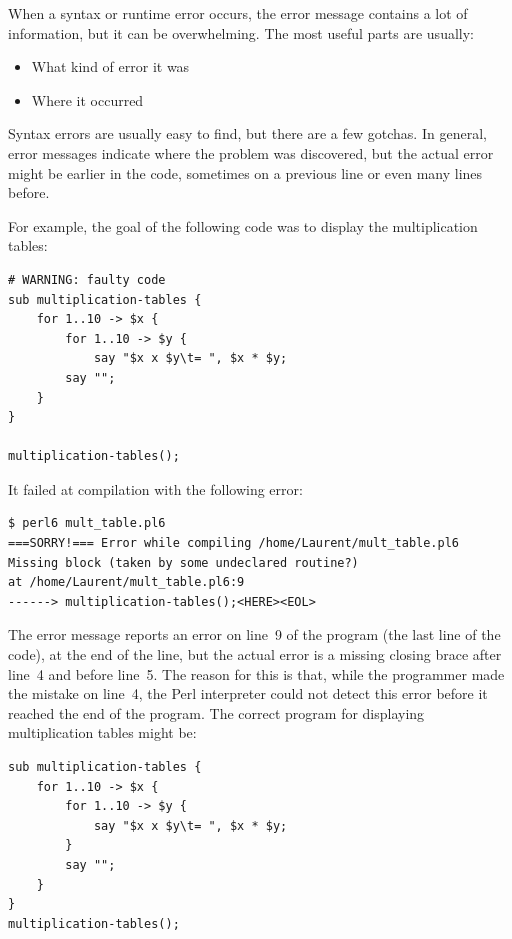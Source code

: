 When a syntax or runtime error occurs, the error message contains
a lot of information, but it can be overwhelming.  The most
useful parts are usually:

\begin{itemize}

\item What kind of error it was

\item Where it occurred

\end{itemize}

Syntax errors are usually easy to find, but there are a few
gotchas. In general, error messages indicate where the problem 
was discovered, but the actual error might be earlier in 
the code, sometimes on a previous line or even many lines 
before.

For example, the goal of the following code was to display the 
multiplication tables:

\begin{verbatim}
# WARNING: faulty code
sub multiplication-tables {
    for 1..10 -> $x {
        for 1..10 -> $y {
            say "$x x $y\t= ", $x * $y;
        say "";
    }
}

multiplication-tables();
\end{verbatim}

It failed at compilation with the following error:

\begin{verbatim}
$ perl6 mult_table.pl6
===SORRY!=== Error while compiling /home/Laurent/mult_table.pl6
Missing block (taken by some undeclared routine?)
at /home/Laurent/mult_table.pl6:9
------> multiplication-tables();<HERE><EOL>
\end{verbatim}

The error message reports an error on line~9 of the program 
(the last line of the code), at the end of the line, but 
the actual error is a missing closing brace after line~4 
and before line~5. The reason for this is that, while the 
programmer made the mistake on line~4, the Perl interpreter 
could not detect this error before it reached the 
end of the program. The correct program for displaying 
multiplication tables might be:

\begin{verbatim}
sub multiplication-tables {
    for 1..10 -> $x {
        for 1..10 -> $y {
            say "$x x $y\t= ", $x * $y;
        }
        say "";
    }
}
multiplication-tables();
\end{verbatim}

